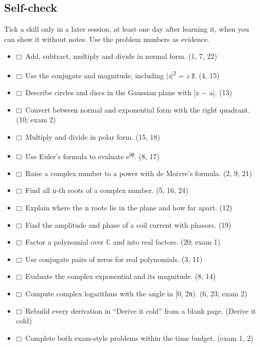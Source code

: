 \documentclass[11pt]{article}
\begin{document}
\begin{keepsection}
\section{Self-check}

Tick a skill only in a later session, at least one day after learning it, when you can show it without notes. Use the problem numbers as evidence.

\begin{itemize}
\item $\mdlgwhtsquare$\ Add, subtract, multiply and divide in normal form. (1, 7, 22)
\item $\mdlgwhtsquare$\ Use the conjugate and magnitude, including |\textit{z}|\textsuperscript{2} = \textit{z} \textit{z̅}. (4, 15)
\item $\mdlgwhtsquare$\ Describe circles and discs in the Gaussian plane with |z \ensuremath{-} a|. (13)
\item $\mdlgwhtsquare$\ Convert between normal and exponential form with the right quadrant. (10; exam 2)
\item $\mdlgwhtsquare$\ Multiply and divide in polar form. (15, 18)
\item $\mdlgwhtsquare$\ Use Euler’s formula to evaluate e\textsuperscript{iφ}. (8, 17)
\item $\mdlgwhtsquare$\ Raise a complex number to a power with de Moivre’s formula. (2, 9, 21)
\item $\mdlgwhtsquare$\ Find all n-th roots of a complex number. (5, 16, 24)
\item $\mdlgwhtsquare$\ Explain where the n roots lie in the plane and how far apart. (12)
\item $\mdlgwhtsquare$\ Find the amplitude and phase of a coil current with phasors. (19)
\item $\mdlgwhtsquare$\ Factor a polynomial over \ensuremath{\mathbb{C}} and into real factors. (20; exam 1)
\item $\mdlgwhtsquare$\ Use conjugate pairs of zeros for real polynomials. (3, 11)
\item $\mdlgwhtsquare$\ Evaluate the complex exponential and its magnitude. (8, 14)
\item $\mdlgwhtsquare$\ Compute complex logarithms with the angle in [0, 2π). (6, 23; exam 2)
\item $\mdlgwhtsquare$\ Rebuild every derivation in “Derive it cold” from a blank page. (Derive it cold)
\item $\mdlgwhtsquare$\ Complete both exam-style problems within the time budget. (exam 1, 2)
\end{itemize}
\end{keepsection}
\end{document}
